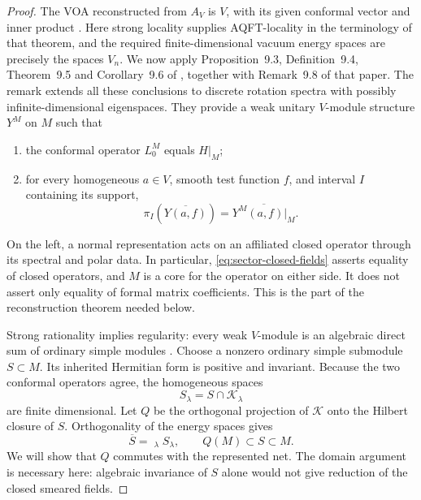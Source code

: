 \begin{proof}
The VOA reconstructed from \(A_V\) is \(V\), with its given conformal
vector and inner product \cite[Theorem~8.9(ii)]{HTVOA}.  Here strong
locality supplies AQFT-locality in the terminology of that theorem, and
the required finite-dimensional vacuum energy spaces are precisely the
spaces \(V_n\).  We now apply Proposition~9.3, Definition~9.4, Theorem~9.5 and
Corollary~9.6 of \cite{HTVOA}, together with Remark~9.8 of that paper.
The remark extends all these conclusions to discrete rotation spectra
with possibly infinite-dimensional eigenspaces.  They provide a weak
unitary \(V\)-module structure \(Y^M\) on \(M\) such that
\begin{enumerate}[label=\textup{(\roman*)}]
  \item the conformal operator \(L_0^M\) equals \(H|_M\);
  \item for every homogeneous \(a\in V\), smooth test function \(f\),
        and interval \(I\) containing its support,
        \begin{equation}\label{eq:sector-closed-fields}
          \pi_I\!\left(\overline{Y(a,f)}\right)
             =\overline{Y^M(a,f)|_M}.
        \end{equation}
\end{enumerate}
On the left, a normal representation acts on an affiliated closed operator
through its spectral and polar data.  In particular, \eqref{eq:sector-closed-fields}
asserts equality of closed operators, and \(M\) is a core for the operator
on either side.  It does not assert only equality of formal matrix
coefficients.  This is the part of the reconstruction theorem needed below.

Strong rationality implies regularity: every weak \(V\)-module is an
algebraic direct sum of ordinary simple modules
\cite[Theorem~4.5]{ABD}.  Choose a
nonzero ordinary simple submodule \(S\subset M\).  Its inherited
Hermitian form is positive and invariant.  Because the two conformal
operators agree, the homogeneous spaces
\[
   S_\lambda=S\cap\mathcal K_\lambda
\]
are finite dimensional.  Let \(Q\) be the orthogonal projection of
\(\mathcal K\) onto the Hilbert closure of \(S\).  Orthogonality of the
energy spaces gives
\[
   \overline S=\mathop{\widehat\bigoplus}_{\lambda}S_\lambda,
   \qquad Q(M)\subset S\subset M.
\]
We will show that \(Q\) commutes with the represented net.  The domain
argument is necessary here: algebraic invariance of \(S\) alone would not
give reduction of the closed smeared fields.


\end{proof}

